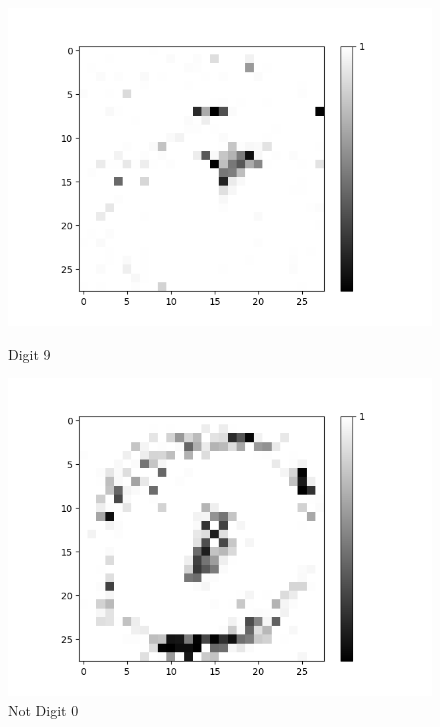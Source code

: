 \begin{figure}[H]
\begin{minipage}[b]{0.19\textwidth}
		\includegraphics[width=\textwidth]{AND(LSM)/Positive/Layer0-Neuron-9.png}
		\caption{Digit 9}
	\end{minipage}
	\hfill
	\begin{minipage}[b]{0.19\textwidth}
		\captionsetup{labelformat=empty}
		\includegraphics[width=\textwidth]{AND(LSM)/Negative/Layer0-Neuron-0.png}
		\caption{Not Digit 0}
	\end{minipage}
	\begin{minipage}[b]{0.19\textwidth}
		\captionsetup{labelformat=empty}

\end{minipage}
\end{figure}
